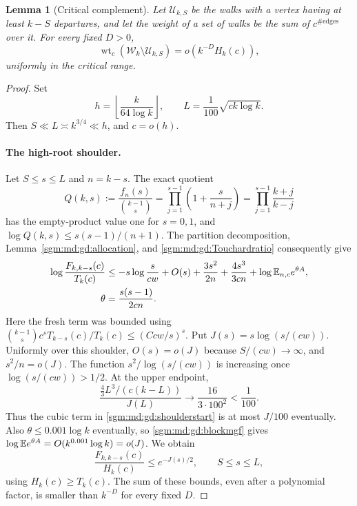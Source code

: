 \documentclass[11pt,letterpaper]{article}
\newtheorem{lemma}[theorem]{Lemma}\newtheorem{proposition}[theorem]{Proposition}\newtheorem{corollary}[theorem]{Corollary}
\theoremstyle{remark}\newtheorem{remark}[theorem]{Remark}
\newcommand{\Wc}{\mathcal W}\newcommand{\Uc}{\mathcal U}\newcommand{\Part}{\operatorname{Part}}
\theoremstyle{definition}\newtheorem{definition}[theorem]{Definition}
\begin{document}
\begin{lemma}[Critical complement]\label{sgm:md:gd:complement}
Let $\mathcal U_{k,S}$ be the walks with a vertex having at least $k-S$
departures, and let the weight of a set of walks be the sum of
$c^{\#\text{edges}}$ over it.  For every fixed $D>0$,
\begin{equation}\label{sgm:md:gd:complementbound}
 \operatorname{wt}_c(\Wc_k\setminus\mathcal U_{k,S})
 =o(k^{-D}H_k(c)),
\end{equation}
uniformly in the critical range.
\end{lemma}
\begin{proof}
Set
\begin{equation}\label{sgm:md:gd:cuts}
 h=\left\lfloor\frac{k}{64\log k}\right\rfloor,
 \qquad L=\frac1{100}\sqrt{ck\log k}.
\end{equation}
Then $S\ll L\asymp k^{3/4}\ll h$, and $c=o(h)$.

\paragraph{The high-root shoulder.}
Let $S\le s\le L$ and $n=k-s$.  The exact quotient
\begin{equation}\label{sgm:md:gd:Q}
 Q(k,s):=\frac{f_n(s)}{\binom{k-1}{s}}
 =\prod_{j=1}^{s-1}\left(1+\frac{s}{n+j}\right)
 =\prod_{j=1}^{s-1}\frac{k+j}{k-j}
\end{equation}
has the empty-product value one for $s=0,1$, and
$\log Q(k,s)\le s(s-1)/(n+1)$.
The partition decomposition, Lemma~\ref{sgm:md:gd:allocation}, and
\eqref{sgm:md:gd:Touchardratio} consequently give
\begin{align}
 \log\frac{F_{k,k-s}(c)}{T_k(c)}
 &\le -s\log\frac{s}{cw}+O(s)
       +\frac{3s^2}{2n}+\frac{4s^3}{3cn}
       +\log\mathbb E_{n,c}e^{\theta A},\label{sgm:md:gd:shoulderstart}\\
 \theta&=\frac{s(s-1)}{2cn}.
\end{align}
Here the fresh term was bounded using
$\binom{k-1}{s}c^sT_{k-s}(c)/T_k(c)\le(Ccw/s)^s$.
Put $J(s)=s\log(s/(cw))$.  Uniformly over this shoulder,
$O(s)=o(J)$ because $S/(cw)\to\infty$, and $s^2/n=o(J)$.
The function $s^2/\log(s/(cw))$ is increasing once
$\log(s/(cw))>1/2$.  At the upper endpoint,
\[
 \frac{\frac43 L^3/(c(k-L))}{J(L)}
 \longrightarrow\frac{16}{3\cdot100^2}<\frac1{100}.
\]
Thus the cubic term in \eqref{sgm:md:gd:shoulderstart} is at most $J/100$
eventually.  Also $\theta\le0.001\log k$ eventually, so
\eqref{sgm:md:gd:blockmgf} gives
$\log\mathbb E e^{\theta A}=O(k^{0.001}\log k)=o(J)$.
We obtain
\begin{equation}\label{sgm:md:gd:shoulder}
 \frac{F_{k,k-s}(c)}{H_k(c)}\le e^{-J(s)/2},
 \qquad S\le s\le L,
\end{equation}
using $H_k(c)\ge T_k(c)$.  The sum of these bounds, even after a
polynomial factor, is smaller than $k^{-D}$ for every fixed $D$.


\end{proof}
\end{document}
